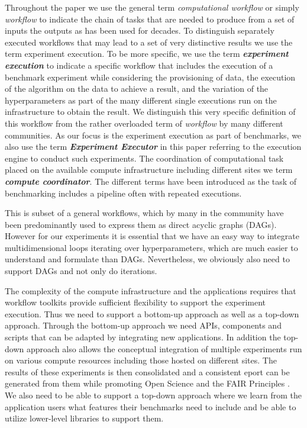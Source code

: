 \documentclass[sigconf]{acmart}
\begin{document}
Throughout the paper we use the general term {\em computational workflow} or simply {\em workflow} to indicate the chain of tasks that are needed to produce from a set of inputs the outputs \citep{def-workflow} as has been used for decades. To distinguish separately executed workflows that may lead to a set of very distinctive results we use the term experiment execution. To be more specific, we use the term {\bf\em experiment execution} to indicate a specific workflow that includes the execution of a benchmark experiment while considering the provisioning of data, the execution of the algorithm on the data to achieve a result, and the variation of the hyperparameters as part of the many different single executions run on the infrastructure to obtain the result. We distinguish this very specific definition of this workflow from the rather overloaded term of {\em workflow} by many different communities. As our focus is the experiment execution as part of benchmarks, we also use the term {\bf\em Experiment Executor} in this paper referring to the execution engine to conduct such experiments. The coordination of computational task placed on the available compute infrastructure including different sites we term {\bf\em compute coordinator}. The different terms have been introduced as the task of benchmarking includes a pipeline often with repeated executions. 

This is subset of a general workflows, which by many in the community have been 
predominantly used to express them as direct acyclic graphs (DAGs). However for our experiments it is essential that we have an easy way to integrate multidimensional loops iterating over hyperparameters, which are much easier to understand and formulate than DAGs. Nevertheless, we obviously also need to support DAGs and not only do iterations.

The complexity of the compute infrastructure and the applications requires that workflow toolkits provide sufficient flexibility to support the experiment execution. Thus we need to support a bottom-up approach as well as a top-down approach. Through the bottom-up approach we need APIs, components and scripts that can be adapted by integrating new applications. In addition the top-down approach also allows the conceptual integration of multiple experiments run on various compute resources including those hosted on different sites. The results of these experiments is then consolidated and a consistent  eport can be generated from them while promoting Open Science and the FAIR Principles \citep{wilkinson2016fair}. We also need to be able to support a top-down approach where we learn from the application users what features their benchmarks need to include and be able to utilize lower-level libraries to support them.
\end{document}

